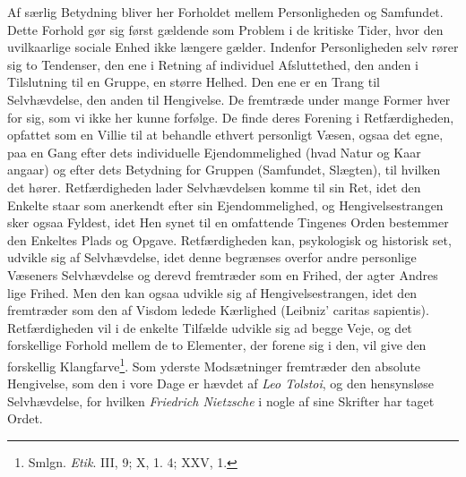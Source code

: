 \documentclass[12pt,a4paper]{book}
\newcommand{\opage}[1]{\marginnote{\footnotesize\textit{[#1]}}}
\begin{document}
Af særlig Betydning bliver her Forholdet mellem Personligheden og Samfundet. Dette Forhold
gør sig først gældende som Problem i de kritiske Tider, hvor den uvilkaarlige sociale Enhed
ikke længere gælder. Indenfor Personligheden selv rører sig to Tendenser, den ene i
Retning af individuel Afsluttethed, den anden i Tilslutning til en Gruppe, en større
Helhed. Den ene er en Trang til Selvhævdelse, den anden til Hengivelse. De fremtræde under
mange Former hver for sig, som vi ikke her kunne forfølge. De finde deres Forening i
Retfærdigheden, opfattet som en Villie til at behandle ethvert personligt Væsen, ogsaa det
egne, paa en Gang efter dets individuelle Ejendommelighed (hvad Natur og Kaar angaar) og
efter dets Betydning for Gruppen (Samfundet, Slægten), til hvilken det hører.
Retfærdigheden lader Selvhævdelsen komme til sin Ret, idet den Enkelte staar som anerkendt
efter sin Ejendommelighed, og Hengivelsestrangen sker ogsaa Fyldest, idet Hen%
\opage{366}synet til en
omfattende Tingenes Orden bestemmer den Enkeltes Plads og Opgave. Retfærdigheden kan,
psykologisk og historisk set, udvikle sig af Selvhævdelse, idet denne begrænses overfor
andre personlige Væseners Selvhævdelse og derevd fremtræder som en Frihed, der agter Andres
lige Frihed. Men den kan ogsaa udvikle sig af Hengivelsestrangen, idet den fremtræder som
den af Visdom ledede Kærlighed (Leibniz' caritas sapientis). Retfærdigheden vil i de
enkelte Tilfælde udvikle sig ad begge Veje, og det forskellige Forhold mellem de to Elementer, der forene sig i den, vil give den forskellig
Klangfarve\footnote{Smlgn. \emph{Etik}. III, 9; X, 1. 4; XXV, 1.}. Som yderste Modsætninger
fremtræder den absolute Hengivelse, som den i vore Dage er hævdet af \emph{Leo Tolstoi}, og
den hensynsløse Selvhævdelse, for hvilken \emph{Friedrich Nietzsche} i nogle af sine
Skrifter har taget Ordet.
\end{document}

